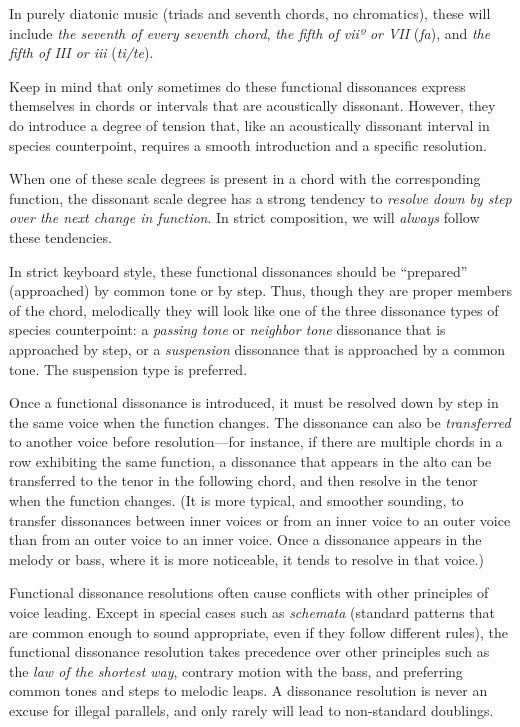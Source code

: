 \documentclass{book}
\begin{document}
In purely diatonic music (triads and seventh chords, no chromatics), these
will include \emph{the seventh of every seventh chord}, \emph{the fifth of
viiº or VII} (\emph{fa}), and \emph{the fifth of III or iii} (\emph{ti/te}).

Keep in mind that only sometimes do these functional dissonances express
themselves in chords or intervals that are acoustically dissonant. However,
they do introduce a degree of tension that, like an acoustically dissonant
interval in species counterpoint, requires a smooth introduction and a
specific resolution.

When one of these scale degrees is present in a chord with the corresponding
function, the dissonant scale degree has a strong tendency to \emph{resolve
down by step over the next change in function}. In strict composition, we will
\emph{always} follow these tendencies.

In strict keyboard style, these functional dissonances should be ``prepared''
(approached) by common tone or by step. Thus, though they are proper members
of the chord, melodically they will look like one of the three dissonance
types of species counterpoint: a \emph{passing tone} or \emph{neighbor tone}
dissonance that is approached by step, or a \emph{suspension} dissonance that
is approached by a common tone. The suspension type is preferred.

Once a functional dissonance is introduced, it must be resolved down by step
in the same voice when the function changes. The dissonance can also be
\emph{transferred} to another voice before resolution---for instance, if there
are multiple chords in a row exhibiting the same function, a dissonance that
appears in the alto can be transferred to the tenor in the following chord,
and then resolve in the tenor when the function changes. (It is more typical,
and smoother sounding, to transfer dissonances between inner voices or from an
inner voice to an outer voice than from an outer voice to an inner voice. Once
a dissonance appears in the melody or bass, where it is more noticeable, it
tends to resolve in that voice.)

Functional dissonance resolutions often cause conflicts with other principles
of voice leading. Except in special cases such as \emph{schemata} (standard
patterns that are common enough to sound appropriate, even if they follow
different rules), the functional dissonance resolution takes precedence over
other principles such as the \emph{law of the shortest way}, contrary motion
with the bass, and preferring common tones and steps to melodic leaps. A
dissonance resolution is never an excuse for illegal parallels, and only
rarely will lead to non-standard doublings.
\end{document}
